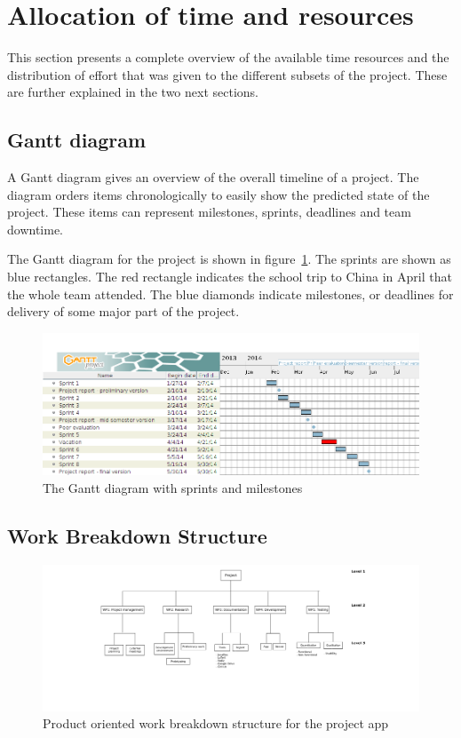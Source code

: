 \section{Allocation of time and resources}
This section presents a complete overview of the available time resources and the distribution of effort that was given to the different subsets of the project. These are further explained in the two next sections.

\subsection{Gantt diagram}
\label{sec:gantt}

A Gantt diagram gives an overview of the overall timeline of a project. The diagram orders items chronologically to easily show the predicted state of the project. These items can represent milestones, sprints, deadlines and team downtime. 

The Gantt diagram for the project is shown in figure~\ref{fig:gantt}. The sprints are shown as blue rectangles. The red rectangle indicates the school trip to China in April that the whole team attended. The blue diamonds indicate milestones, or deadlines for delivery of some major part of the project.


\begin{figure}[H]
\includegraphics[width=\textwidth]{ch/projectManagement/fig/gantt.png}
\caption{The Gantt diagram with sprints and milestones}
\label{fig:gantt}
\end{figure}


\subsection{Work Breakdown Structure}
\label{sec:wbs}

\begin{figure}[H]
\includegraphics[width=\textwidth, trim=9.5cm 6cm 8.5cm 0.8cm,clip]{ch/projectManagement/fig/wbs2.png}
\caption{Product oriented work breakdown structure for the project app}
\label{fig:wbs}
\end{figure}

